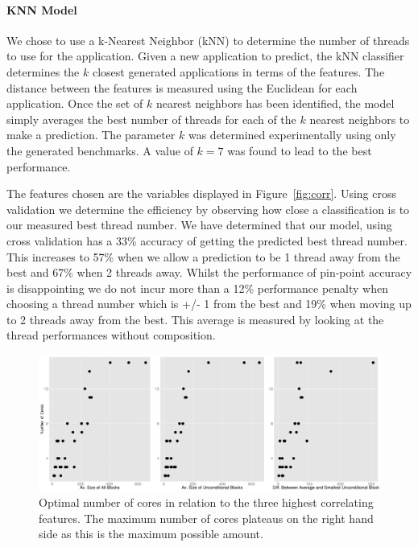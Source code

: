 \vspace{2mm}

\paragraph{KNN Model}

We chose to use a k-Nearest Neighbor (kNN) to determine the number of threads to use for the application.
Given a new application to predict, the kNN classifier determines the $k$ closest generated applications in terms of the features.
The distance between the features is measured using the Euclidean for each application.
Once the set of $k$ nearest neighbors has been identified, the model simply averages the best number of threads for each of the $k$ nearest neighbors to make a prediction.
The parameter $k$ was determined experimentally using only the generated benchmarks.
A value of $k=7$ was found to lead to the best performance.

The features chosen are the variables displayed in Figure~\ref{fig:corr}.
Using cross validation we determine the efficiency by observing how close a classification is to our measured best thread number.
We have determined that our model, using cross validation has a 33\% accuracy of getting the predicted best thread number.
This increases to 57\% when we allow a prediction to be 1 thread away from the best and 67\% when 2 threads away.
Whilst the performance of pin-point accuracy is disappointing we do not incur more than a 12\% performance penalty when choosing a thread number which is +/- 1 from the best and 19\% when moving up to 2 threads away from the best.
This average is measured by looking at the thread performances without composition.

\begin{figure}
  \center
  \includegraphics[width=1\textwidth]{graphics/lineargraphs.pdf}
  \caption{Optimal number of cores in relation to the three highest correlating features. The maximum number of cores plateaus on the right hand side as this is the maximum possible amount.}\label{fig:maxav}
\end{figure}
